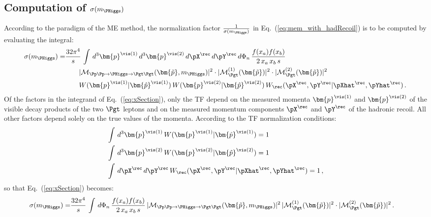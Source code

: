 \subsection{Computation of $\sigma(m_{\PHiggs})$}
\label{sec:mem_xSection}

According to the paradigm of the ME method, the normalization factor
$\frac{1}{\sigma(m_{\PHiggs})}$ in Eq.~(\ref{eq:mem_with_hadRecoil}) is to be computed
by evaluating the integral:
\begin{align}
\sigma(m_{\PHiggs}) = &
  \frac{32\pi^{4}}{s} \, \int \, d^{3}\bm{p}^{\vis(1)} \, d^{3}\bm{p}^{\vis(2)} \, d\pX^{\rec} \, d\pY^{\rec} \, 
  d\Phi_{n} \, \frac{f(x_{a}) f(x_{b})}{2 \, x_{a} \, x_{b} \, s} \, \hspace{2cm} \nonumber \\
& \qquad \vert \mathcal{M}_{\Pp\Pp \to \PHiggs \to \Pgt\Pgt}(\bm{\tilde{p}},m_{\PHiggs}) \vert^{2} 
  \cdot \vert \mathcal{M}^{(1)}_{\Pgt}(\bm{\tilde{p}}) \vert^{2} 
  \cdot \vert \mathcal{M}^{(2)}_{\Pgt}(\bm{\tilde{p}}) \vert^{2} \hspace{2cm} \nonumber \\
& \qquad W(\bm{p}^{\vis(1)}|\bm{\hat{p}}^{\vis(1)}) \, W(\bm{p}^{\vis(2)}|\bm{\hat{p}}^{\vis(2)}) \, W_{\rec}( \pX^{\rec},\pY^{\rec} | \pXhat^{\rec},\pYhat^{\rec} ) \, .
\label{eq:xSection}
\end{align}
Of the factors in the integrand of Eq.~(\ref{eq:xSection}),
only the TF depend on the measured momenta $\bm{p}^{\vis(1)}$ and $\bm{p}^{\vis(2)}$ of the visible decay products of the two $\Pgt$ leptons
and on the measured momentum components $\pX^{\rec}$ and $\pY^{\rec}$ of the hadronic recoil.
All other factors depend solely on the true values of the momenta.
According to the TF normalization conditions:
\begin{align}
& \int \, d^{3}\bm{p}^{\vis(1)} \, W(\bm{p}^{\vis(1)}|\bm{\hat{p}}^{\vis(1)}) = 1 \nonumber \\
& \int \, d^{3}\bm{p}^{\vis(2)} \, W(\bm{p}^{\vis(2)}|\bm{\hat{p}}^{\vis(2)}) = 1 \nonumber \\
& \int \, d\pX^{\rec} \, d\pY^{\rec} \, W_{\rec}( \pX^{\rec},\pY^{\rec} | \pXhat^{\rec},\pYhat^{\rec} ) = 1 \, ,
\end{align}
so that Eq.~(\ref{eq:xSection}) becomes:
\begin{align}
\sigma(m_{\PHiggs}) = &
  \frac{32\pi^{4}}{s} \, \int \, 
  d\Phi_{n} \, \frac{f(x_{a}) f(x_{b})}{2 \, x_{a} \, x_{b} \, s} \, \vert \mathcal{M}_{\Pp\Pp \to \PHiggs \to \Pgt\Pgt}(\bm{\tilde{p}},m_{\PHiggs}) \vert^{2} \, 
  \vert \mathcal{M}^{(1)}_{\Pgt}(\bm{\tilde{p}}) \vert^{2} 
  \cdot \vert \mathcal{M}^{(2)}_{\Pgt}(\bm{\tilde{p}}) \vert^{2} \, .
\label{eq:xSection2}
\end{align}

